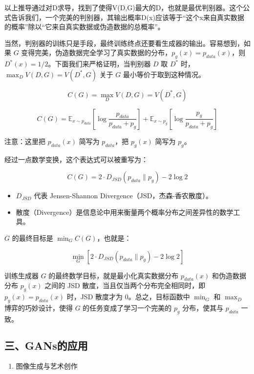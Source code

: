 以上推导通过对D求导，找到了使得V(D,G)最大的D，也就是最优判别器。这个公式告诉我们，一个完美的判别器，其输出概率D(x)应该等于``这个x来自真实数据的概率''除以``它来自真实数据或伪造数据的总概率''。

当然，判别器的训练只是手段，最终训练终点还要看生成器的输出。容易想到，如果 \(G\) 变得完美，伪造数据完全学习了真实数据的分布，\(p_g(x)=p_{data}(x)\)，则 \(D^*(x)=1/2\)。下面我们来严格证明，当判别器 \(D\) 取 \(D^*\) 时，\(\max_D V(D,G)=V(D^*,G)\) 关于 \(G\) 最小等价于取到这种情况。

\[
C(G)=\max_D V(D,G)=V(D^*,G)
\]

\[
C(G)=\mathbb{E}_{x\sim p_{data}}\left[\log\frac{p_{data}}{p_{data}+p_g}\right]
+\mathbb{E}_{x\sim p_g}\left[\log\frac{p_g}{p_{data}+p_g}\right]
\]

注意：这里把 \(p_{data}(x)\) 简写为 \(p_{data}\)，把 \(p_g(x)\) 简写为 \(p_g\)。

经过一点数学变换，这个表达式可以被重写为：

\[
C(G)=2\cdot D_{JSD}(p_{data}\parallel p_g)-2\log 2
\]

\begin{itemize}
\tightlist
\item
  \(D_{JSD}\) 代表 Jensen-Shannon Divergence（JSD，杰森-香农散度）。
\item
  散度（Divergence）是信息论中用来衡量两个概率分布之间差异性的数学工具。
\end{itemize}

\(G\) 的最终目标是 \(\min_G C(G)\)，也就是：

\[
\min_G [2\cdot D_{JSD}(p_{data}\parallel p_g)-2\log 2]
\]

训练生成器 \(G\) 的最终数学目标，就是最小化真实数据分布 \(p_{data}(x)\) 和伪造数据分布 \(p_g(x)\) 之间的 JSD 散度，当且仅当两个分布完全相同时，即 \(p_g(x)=p_{data}(x)\) 时，JSD 散度才为 \(0\)。总之，目标函数中 \(\min_G\) 和 \(\max_D\) 博弈的巧妙设计，使得 \(G\) 的任务变成了学习一个完美的 \(p_g\) 分布，使其与 \(p_{data}\) 一致。

\hypertarget{ux4e09gansux7684ux5e94ux7528}{%
\subsection{三、GANs的应用}\label{ux4e09gansux7684ux5e94ux7528}}

\begin{enumerate}
\def\labelenumi{\arabic{enumi}.}
\tightlist
\item
  图像生成与艺术创作
\end{enumerate}

